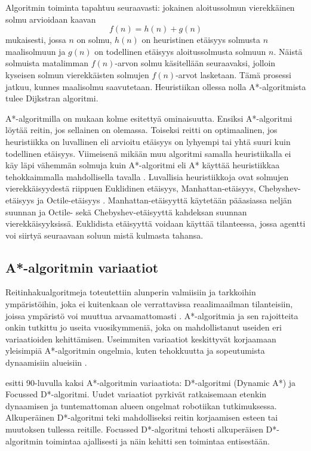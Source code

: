 \documentclass[utf8]{gradu3}
\begin{document}
Algoritmin toiminta tapahtuu seuraavasti: jokainen aloitussolmun vierekkäinen solmu arvioidaan kaavan \[f(n)=h(n)+g(n)\] mukaisesti, jossa \(n\) on solmu, \(h(n)\) on heuristinen etäisyys solmusta \(n\) maalisolmuun ja \(g(n)\) on todellinen etäisyys aloitussolmusta solmuun \(n\). Näistä solmuista matalimman \(f(n)\)-arvon solmu käsitellään seuraavaksi, jolloin kyseisen solmun vierekkäisten solmujen \(f(n)\)-arvot lasketaan. Tämä prosessi jatkuu, kunnes maalisolmu saavutetaan. Heuristiikan ollessa nolla A*-algoritmista tulee Dijkstran algoritmi.

A*-algoritmilla on \textcite{hart1968formal} mukaan kolme esitettyä ominaisuutta. Ensiksi A*-algoritmi löytää reitin, jos sellainen on olemassa. Toiseksi reitti on optimaalinen, jos heuristiikka on luvallinen eli arvioitu etäisyys on lyhyempi tai yhtä suuri kuin todellinen etäisyys. Viimeisenä mikään muu algoritmi samalla heuristiikalla ei käy läpi vähemmän solmuja kuin A*-algoritmi eli A* käyttää heuristiikkaa tehokkaimmalla mahdollisella tavalla \parencite{cui2011based,hart1968formal}. Luvallisia heuristiikkoja ovat solmujen vierekkäisyydestä riippuen Euklidinen etäisyys, Manhattan-etäisyys, Chebyshev-etäisyys ja Octile-etäisyys \parencite{botea2013pathfinding,duchovn2014path}. Manhattan-etäisyyttä käytetään pääasiassa neljän suunnan ja Octile- sekä Chebyshev-etäisyyttä kahdeksan suunnan vierekkäisyyksissä. Euklidista etäisyyttä voidaan käyttää tilanteessa, jossa agentti voi siirtyä seuraavaan soluun mistä kulmasta tahansa.

\subsection{A*-algoritmin variaatiot}
\label{avariaatiot}

Reitinhakualgoritmeja toteutettiin alunperin valmiisiin ja tarkkoihin ympäristöihin, joka ei kuitenkaan ole verrattavissa reaalimaailman tilanteisiin, joissa ympäristö voi muuttua arvaamattomasti \parencite{lawande2022systematic}. A*-algoritmia ja sen rajoitteita onkin tutkittu jo useita vuosikymmeniä, joka on mahdollistanut useiden eri variaatioiden kehittämisen. Useimmiten variaatiot keskittyvät korjaamaan yleisimpiä A*-algoritmin ongelmia, kuten tehokkuutta ja sopeutumista dynaamisiin alueisiin \parencite{stentz1994optimal}.

\textcite{stentz1994optimal,stentz1995focussed} esitti 90-luvulla kaksi A*-algoritmin variaatiota: D*-algoritmi (Dynamic A*) ja Focussed D*-algoritmi. Uudet variaatiot pyrkivät ratkaisemaan etenkin dynaamisen ja tuntemattoman alueen ongelmat robotiikan tutkimuksessa. Alkuperäinen D*-algoritmi teki mahdolliseksi reitin korjaamisen esteen tai muutoksen tullessa reitille. Focussed D*-algoritmi tehosti alkuperäisen D*-algoritmin toimintaa ajallisesti ja näin kehitti sen toimintaa entisestään.
\end{document}
